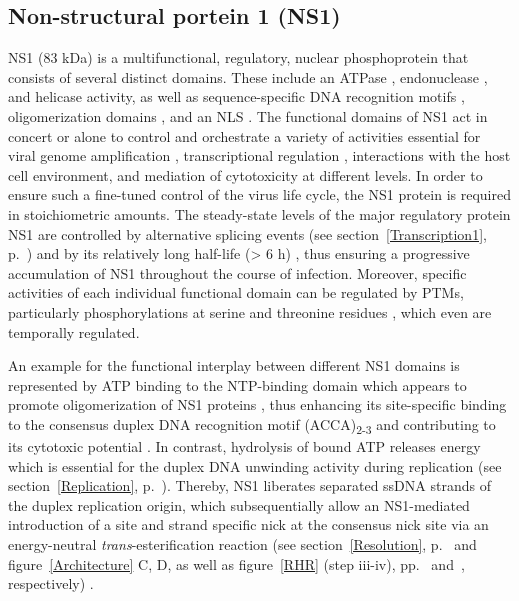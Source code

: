 \subsection{Non-structural portein 1 (NS1)}

NS1 (83 kDa) is a multifunctional, regulatory, nuclear phosphoprotein that consists of several distinct domains. These include an ATPase \cite{pmid1833878}, endonuclease \cite{pmid12050365, pmid2527311, pmid7747462, pmid9349487}, and helicase \cite{pmid8106366} activity, as well as sequence-specific DNA recognition motifs \cite{pmid9813208, pmid7853501, pmid17898054}, oligomerization domains \cite{pmid9311818}, and an NLS \cite{pmid8372437}. The functional domains of NS1 act in concert or alone to control and orchestrate a variety of activities essential for viral genome amplification \cite{pmid1388310, pmid8437230, pmid8076610}, transcriptional regulation \cite{pmid3171551, pmid1830114, pmid9454706}, interactions with the host cell environment, and mediation of cytotoxicity \cite{pmid2137660, pmid2167840, pmid1388209, pmid2144594} at different levels. In order to ensure such a fine-tuned control of the virus life cycle, the NS1 protein is required in stoichiometric amounts. The steady-state levels of the major regulatory protein NS1 are controlled by alternative splicing events (see section~\ref{Transcription1}, p.~\pageref{Transcription1}) and by its relatively long half-life (> 6 h) \cite{pmid2142555, pmid11437668}, thus ensuring  a progressive accumulation of NS1 throughout the course of infection. Moreover, specific activities of each individual functional domain can be regulated by PTMs, particularly phosphorylations at serine and threonine residues \cite{pmid4020958, pmid3739422}, which even are temporally regulated.

An example for the functional interplay between different NS1 domains is represented by ATP binding to the NTP-binding domain which appears to promote oligomerization of NS1 proteins \cite{pmid8372437}, thus enhancing its site-specific binding to the consensus duplex DNA recognition motif (ACCA)\textsubscript{2-3} \cite{pmid7853501} and contributing to its cytotoxic potential \cite{pmid2144594, pmid8317090, pmid11112491}. In contrast, hydrolysis of bound ATP releases energy \cite{pmid1833878} which is essential for the duplex DNA unwinding activity \cite{pmid2159383, pmid1833878, pmid7853520, pmid7747462} during replication (see section~\ref{Replication}, p.~\pageref{Replication}). Thereby, NS1 liberates separated ssDNA strands of the duplex replication origin, which subsequentially allow an NS1-mediated introduction of a site and strand specific nick at the consensus nick site via an energy-neutral \textit{trans}-esterification reaction (see section~\ref{Resolution}, p.~\pageref{Resolution} and figure~\ref{Architecture} C, D, as well as figure~\ref{RHR} (step iii-iv), pp.~\pageref{Architecture} and~\pageref{RHR}, respectively) \cite{pmid2173787, pmid10516041, pmid11390575}.

